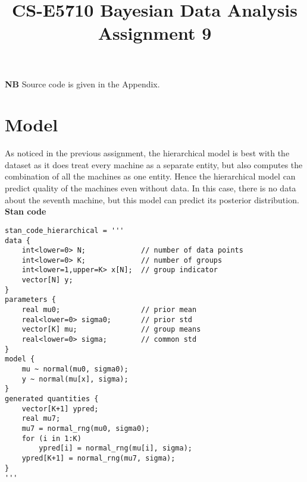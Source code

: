 \documentclass{article}
\begin{document}
\title{CS-E5710 Bayesian Data Analysis\\Assignment 9 }                  
\maketitle



\textbf{NB} Source code is given in the Appendix.

\section{Model}

As noticed in the previous assignment, the hierarchical model is best with the dataset as it does treat every machine as a separate entity, but also computes the combination of all the machines as one entity. Hence the hierarchical model can predict quality of the machines even without data. In this case, there is no data about the seventh machine, but this model can predict its posterior distribution.\\

\textbf{Stan code}

\begin{verbatim}
stan_code_hierarchical = '''
data {
    int<lower=0> N;             // number of data points
    int<lower=0> K;             // number of groups
    int<lower=1,upper=K> x[N];  // group indicator
    vector[N] y;
}
parameters {
    real mu0;                   // prior mean
    real<lower=0> sigma0;       // prior std
    vector[K] mu;               // group means
    real<lower=0> sigma;        // common std
}
model {
    mu ~ normal(mu0, sigma0);
    y ~ normal(mu[x], sigma);
}
generated quantities {
    vector[K+1] ypred;
    real mu7;
    mu7 = normal_rng(mu0, sigma0);
    for (i in 1:K)
        ypred[i] = normal_rng(mu[i], sigma);
    ypred[K+1] = normal_rng(mu7, sigma);
}
'''
\end{verbatim}
\end{document}
